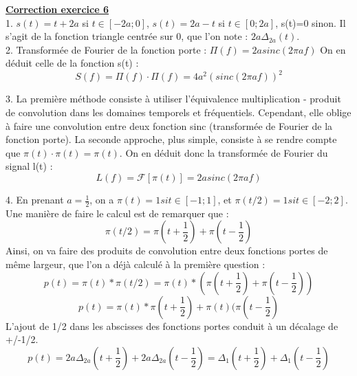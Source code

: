 \documentclass[11pt]{report}
\begin{document}
	\vspace{1\baselineskip}
	
	\textbf{\underline{Correction exercice 6}}\\
	
	1. $s(t)=t+2a$ si $t \in [-2a;0]$, $s(t)=2a-t$ si $t \in [0;2a]$, s(t)=0 sinon. Il s'agit de la fonction triangle centrée sur 0, que l'on note : $2a\Delta_{2a}(t)$.\\
	
	2. Transformée de Fourier de la fonction porte : $\Pi(f)=2asinc(2\pi af)$
	On en déduit celle de la fonction s(t) : 
	\begin{equation*}
	S(f)=\Pi(f) \cdot \Pi(f) = 4a^{2}(sinc(2\pi af))^{2}
	\end{equation*}
	
	3. La première méthode consiste à utiliser l'équivalence multiplication - produit de convolution dans les domaines temporels et fréquentiels. Cependant, elle oblige à faire une convolution entre deux fonction sinc (transformée de Fourier de la fonction porte).
	La seconde approche, plus simple, consiste à se rendre compte que $\pi(t) \cdot \pi(t) = \pi(t)$. On en déduit donc la transformée de Fourier du signal l(t) :
	\begin{equation*}
	L(f)=\mathcal{F}[\pi(t)]=2asinc(2\pi af)
	\end{equation*}
	
	4. En prenant $a=\frac{1}{2}$, on a $\pi(t) = 1 si t \in [-1;1]$, et $\pi(t/2) = 1 si t \in [-2;2]$. Une manière de faire le calcul est de remarquer que :
	\begin{equation*}
	\pi(t/2) = \pi(t+\frac{1}{2})+\pi(t-\frac{1}{2})
	\end{equation*}
	Ainsi, on va faire des produits de convolution entre deux fonctions portes de même largeur, que l'on a déjà calculé à la première question :
	\begin{equation*}
	p(t)=\pi(t)*\pi(t/2)=\pi(t)*(\pi(t+\frac{1}{2})+\pi(t-\frac{1}{2}))
	\end{equation*}
	\begin{equation*}
	p(t)=\pi(t)*\pi(t+\frac{1}{2})+\pi(t)(\pi(t-\frac{1}{2})
	\end{equation*}
	L'ajout de 1/2 dans les abscisses des fonctions portes conduit à un décalage de +/-1/2.
	\begin{equation*}
	p(t)=2a\Delta_{2a}(t+\frac{1}{2})+2a\Delta_{2a}(t-\frac{1}{2})=\Delta_{1}(t+\frac{1}{2})+\Delta_{1}(t-\frac{1}{2})
	\end{equation*}
	
\end{document}
